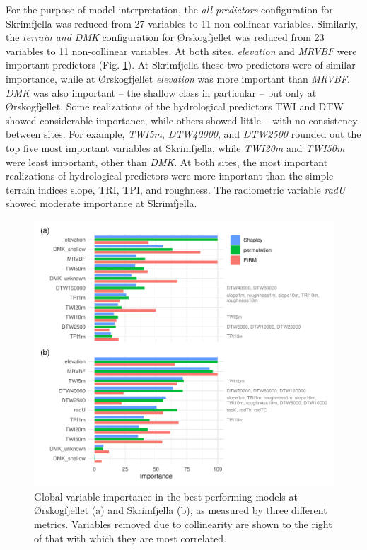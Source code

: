 \documentclass[soil, manuscript]{copernicus}
\begin{document}
For the purpose of model interpretation, the \emph{all predictors} configuration for Skrimfjella was reduced from 27 variables to 11 non-collinear variables.
Similarly, the \emph{terrain and DMK} configuration for Ørskogfjellet was reduced from 23 variables to 11 non-collinear variables.
At both sites, \emph{elevation} and \emph{MRVBF} were important predictors (Fig. \ref{fig:varImp}).
At Skrimfjella these two predictors were of similar importance, while at Ørskogfjellet \emph{elevation} was more important than \emph{MRVBF}.
\emph{DMK} was also important -- the shallow class in particular -- but only at Ørskogfjellet.
Some realizations of the hydrological predictors TWI and DTW showed considerable importance, while others showed little -- with no consistency between sites.
For example, \emph{TWI5m}, \emph{DTW40000}, and \emph{DTW2500} rounded out the top five most important variables at Skrimfjella, while \emph{TWI20m} and \emph{TWI50m} were least important, other than \emph{DMK}.
At both sites, the most important realizations of hydrological predictors were more important than the simple terrain indices slope, TRI, TPI, and roughness.
The radiometric variable \emph{radU} showed moderate importance at Skrimfjella.

\begin{figure}
\centering
\includegraphics{figures/variable_importance.pdf}
\caption{\label{fig:varImp}Global variable importance in the best-performing models at Ørskogfjellet (a) and Skrimfjella (b), as measured by three different metrics. Variables removed due to collinearity are shown to the right of that with which they are most correlated.}
\end{figure}
\end{document}
